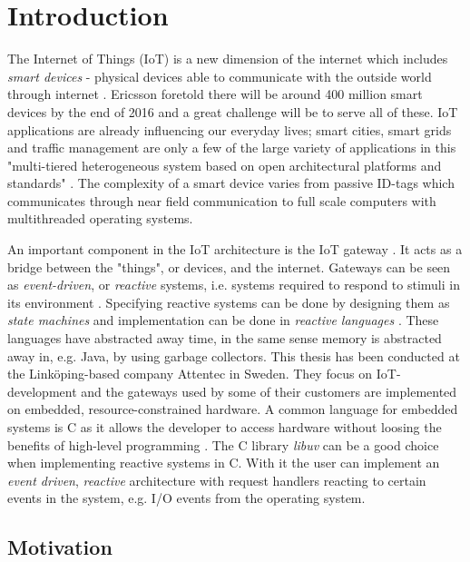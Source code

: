 \chapter{Introduction}
\label{cha:introduction}

The Internet of Things (IoT) is a new dimension of the internet which includes
\textit{smart devices} - physical devices able to communicate with the outside
world through internet
\cite{design-principles-for-distributed-embedded-applications}. Ericsson
foretold there will be around 400 million smart devices by the end of 2016
\cite{ericsson-iot-forecast} and a great challenge will be to serve all of
these. IoT applications are already influencing our everyday lives; smart
cities, smart grids and traffic management are only a few of the large variety
of applications in this "multi-tiered heterogeneous system based on open
architectural platforms and standards" \cite{gardavsevic2017iot}. The
complexity of a smart device varies from passive ID-tags which communicates
through near field communication to full scale computers with multithreaded
operating systems.

An important component in the IoT architecture is the IoT gateway
\cite{chen2011brief}. It acts as a bridge between the "things", or devices, and
the internet. Gateways can be seen as \textit{event-driven}, or
\textit{reactive} systems, i.e. systems required to respond to stimuli in its
environment \cite{garlan1993introduction} \cite{harel1985development}.
Specifying reactive systems can be done by designing them as \textit{state
machines} and implementation can be done in \textit{reactive languages}
\cite{bainomugisha2013survey}. These languages have abstracted away time, in
the same sense memory is abstracted away in, e.g. Java, by using garbage
collectors. This thesis has been conducted at the Linköping-based company
Attentec in Sweden. They focus on IoT-development and the gateways used by some
of their customers are implemented on embedded, resource-constrained hardware.
A common language for embedded systems is C as it allows the developer to
access hardware without loosing the benefits of high-level programming
\cite{nahas2012choosing} \cite{barr1999programming}. The C library
\textit{libuv} can be a good choice when implementing reactive systems in C.
With it the user can implement an \textit{event driven}, \textit{reactive}
architecture with request handlers reacting to certain events in the system,
e.g. I/O events from the operating system. \cite{libuv-webpage}

\section{Motivation}
\label{sec:motivation}

